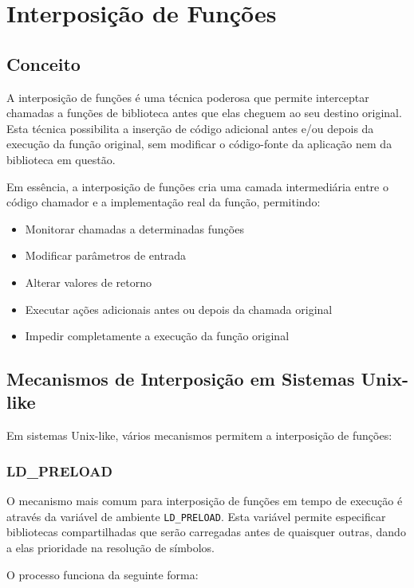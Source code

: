 \section{Interposição de Funções}\label{sec:interposicao}

\subsection{Conceito}

A interposição de funções é uma técnica poderosa que permite interceptar chamadas a funções de biblioteca antes que elas cheguem ao seu destino original. Esta técnica possibilita a inserção de código adicional antes e/ou depois da execução da função original, sem modificar o código-fonte da aplicação nem da biblioteca em questão.

Em essência, a interposição de funções cria uma camada intermediária entre o código chamador e a implementação real da função, permitindo:
\begin{itemize}
    \item Monitorar chamadas a determinadas funções
    \item Modificar parâmetros de entrada
    \item Alterar valores de retorno
    \item Executar ações adicionais antes ou depois da chamada original
    \item Impedir completamente a execução da função original
\end{itemize}

\subsection{Mecanismos de Interposição em Sistemas Unix-like}

Em sistemas Unix-like, vários mecanismos permitem a interposição de funções:

\subsubsection{LD\_PRELOAD}

O mecanismo mais comum para interposição de funções em tempo de execução é através da variável de ambiente \texttt{LD\_PRELOAD}. Esta variável permite especificar bibliotecas compartilhadas que serão carregadas antes de quaisquer outras, dando a elas prioridade na resolução de símbolos.

O processo funciona da seguinte forma:

